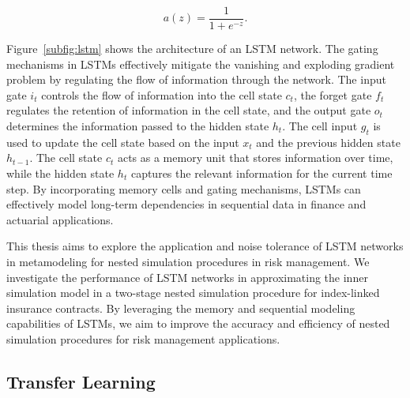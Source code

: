 \begin{equation*}
    a(z) = \frac{1}{1 + e^{-z}}.
\end{equation*}

Figure~\ref{subfig:lstm} shows the architecture of an LSTM network.
The gating mechanisms in LSTMs effectively mitigate the vanishing and exploding gradient problem by regulating the flow of information through the network.
The input gate $i_t$ controls the flow of information into the cell state $c_t$, the forget gate $f_t$ regulates the retention of information in the cell state, and the output gate $o_t$ determines the information passed to the hidden state $h_t$.
The cell input $g_t$ is used to update the cell state based on the input $x_t$ and the previous hidden state $h_{t-1}$.
The cell state $c_t$ acts as a memory unit that stores information over time, while the hidden state $h_t$ captures the relevant information for the current time step.
By incorporating memory cells and gating mechanisms, LSTMs can effectively model long-term dependencies in sequential data in finance and actuarial applications.

This thesis aims to explore the application and noise tolerance of LSTM networks in metamodeling for nested simulation procedures in risk management.
We investigate the performance of LSTM networks in approximating the inner simulation model in a two-stage nested simulation procedure for index-linked insurance contracts.
By leveraging the memory and sequential modeling capabilities of LSTMs, we aim to improve the accuracy and efficiency of nested simulation procedures for risk management applications.

\subsection{Transfer Learning}

